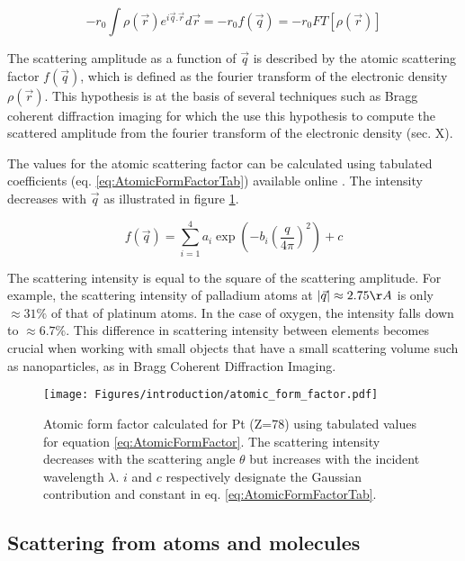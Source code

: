 \begin{equation}
    \label{eq:AtomicFormFactor}
    -r_0 \int \rho (\vec{r}) e^{i\vec{q}.\vec{r}} d\vec{r} = -r_0 f(\vec{q}) = -r_0 FT [\rho (\vec{r})]
\end{equation}

The scattering amplitude as a function of $\vec{q}$ is described by the atomic scattering factor $f(\vec{q})$, which is defined as the fourier transform of the electronic density $\rho(\vec{r})$. This hypothesis is at the basis of several techniques such as Bragg coherent diffraction imaging for which the use this hypothesis to compute the scattered amplitude from the fourier transform of the electronic density (sec. X).

The values for the atomic scattering factor can be calculated using tabulated coefficients (eq. \ref{eq:AtomicFormFactorTab}) available online \parencite{InterTablesOfCryst}.
The intensity decreases with $\vec{q}$ as illustrated in figure \ref{fig:atomic_form_factor}.

\begin{equation}
    \label{eq:AtomicFormFactorTab}
    f(\vec{q}) = \sum_{i=1}^4 a_i \exp (-b_i (\frac{q} {4\pi})^2) + c
\end{equation}

The scattering intensity is equal to the square of the scattering amplitude.
For example, the scattering intensity of palladium atoms at $|\vec{q}| \approx 2.75 \AA$ is only $\approx 31\%$ of that of platinum atoms. In the case of oxygen, the intensity falls down to $\approx 6.7\%$.
This difference in scattering intensity between elements becomes crucial when working with small objects that have a small scattering volume such as nanoparticles, as in Bragg Coherent Diffraction Imaging.

\begin{figure}[!htb]
    \centering
    \texttt{[image: Figures/introduction/atomic\_form\_factor.pdf]}
    \caption{
    Atomic form factor calculated for Pt (Z=78) using tabulated values \parencite{InterTablesOfCryst} for equation \ref{eq:AtomicFormFactor}. The scattering intensity decreases with the scattering angle $\theta$ but increases with the incident wavelength $\lambda$. $i$ and $c$ respectively designate the Gaussian contribution and constant in eq. \ref{eq:AtomicFormFactorTab}.
    }
    \label{fig:atomic_form_factor}
\end{figure}

\subsection{Scattering from atoms and molecules}

